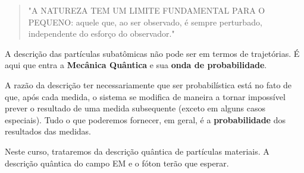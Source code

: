 \begin{quote}
"A NATUREZA TEM UM LIMITE FUNDAMENTAL PARA O PEQUENO: aquele que, ao ser observado, é sempre perturbado, independente do esforço do observador."
\end{quote}

A descrição das partículas subatômicas não pode ser em termos de trajetórias. É aqui que entra a \textbf{Mecânica Quântica} e sua \textbf{onda de probabilidade}.

A razão da descrição ter necessariamente que ser probabilística está no fato de que, após cada medida, o sistema se modifica de maneira a tornar impossível prever o resultado de uma medida subsequente (exceto em alguns casos especiais). Tudo o que poderemos fornecer, em geral, é a \textbf{probabilidade} dos resultados das medidas.

Neste curso, trataremos da descrição quântica de partículas materiais. A descrição quântica do campo EM e o fóton terão que esperar.